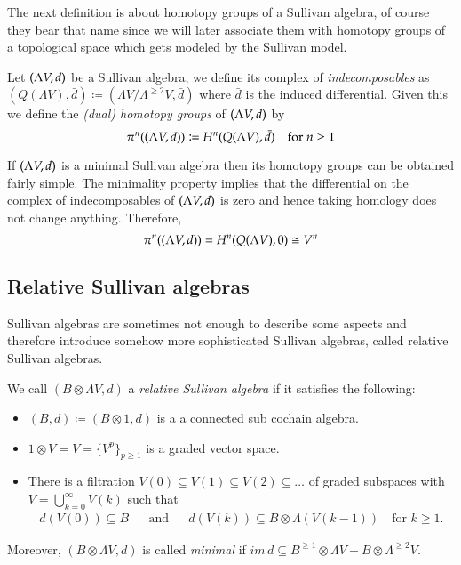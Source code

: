 The next definition is about homotopy groups of a Sullivan algebra, of course they bear that name since we will later
associate them with homotopy groups of a topological space which gets modeled by the Sullivan model.

\begin{Definition}
 Let $(\Lambda V,d)$ be a Sullivan algebra, we define its complex of \emph{indecomposables} as
 $(Q(\Lambda V),\bar{d}) \coloneqq (\Lambda V / \Lambda^{\geq 2} V , \bar{d})$ where $\bar{d}$ is the induced differential.
 Given this we define the \emph{(dual) homotopy groups} of $(\Lambda V,d)$ by 
 $$ \pi^n ( (\Lambda V,d)) \coloneqq H^n(Q(\Lambda V),\bar{d}) \quad \text{for $n \geq 1$}$$
\end{Definition}

\begin{Remark}
 If $(\Lambda V,d)$ is a minimal Sullivan algebra then its homotopy groups can be obtained fairly simple. The minimality property
 implies that the differential on the complex of indecomposables of $(\Lambda V,d)$ is zero and hence taking
 homology does not change anything. Therefore, 
 $$ \pi^n ( (\Lambda V,d)) = H^n(Q(\Lambda V),0) \cong V^n$$
\end{Remark}

\subsection{Relative Sullivan algebras}

Sullivan algebras are sometimes not enough to describe some aspects and therefore introduce somehow more sophisticated
Sullivan algebras, called relative Sullivan algebras.

\begin{Definition}
 We call $(B \otimes \Lambda V,d)$ a \emph{relative Sullivan algebra} if it satisfies the following:
 
 \begin{itemize}
  \item $(B,d) \coloneqq (B \otimes 1, d)$ is a a connected sub cochain algebra.
  \item $1 \otimes V = V = { \lbrace V^p \rbrace}_{ p \geq 1}$ is a graded vector space.
  \item There is a filtration $V(0) \subseteq V(1) \subseteq V(2) \subseteq \ldots$ of graded subspaces
    with  $ V = \bigcup_{k = 0}^{\infty} V(k)$ such that 
    \begin{align*}
     d(V(0)) \subseteq B &  & \text{and} & & d(V(k)) \subseteq B \otimes \Lambda (V(k-1)) \quad \text{for $k \geq 1$.}
    \end{align*}
 \end{itemize}
 Moreover, $(B \otimes \Lambda V,d)$ is called \emph{minimal} if 
 $im \, d \subseteq B^{\geq 1} \otimes \Lambda V + B \otimes \Lambda^{\geq 2} V$.
\end{Definition}

